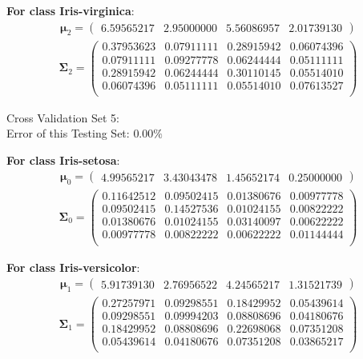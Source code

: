 \documentclass[11pt,a4paper]{article}
\newcommand{\htab}{\hspace*{0.63cm}}
\newcommand{\bs}[1]{\boldsymbol{#1}}
\begin{document}
\textbf{For class Iris-virginica}:
\begin{align} \bs{\mu}_{2} = \begin{pmatrix} 
6.59565217 & 2.95000000 & 5.56086957 & 2.01739130 
 \end{pmatrix}  \end{align} 
\vspace{-1cm}
\begin{align} \bs{\Sigma}_{2} = \begin{pmatrix} 
0.37953623 & 0.07911111 & 0.28915942 & 0.06074396 \\ 
0.07911111 & 0.09277778 & 0.06244444 & 0.05111111 \\ 
0.28915942 & 0.06244444 & 0.30110145 & 0.05514010 \\ 
0.06074396 & 0.05111111 & 0.05514010 & 0.07613527 \\ 
\end{pmatrix} \end{align}

\newpage

Cross Validation Set 5: \\
\htab Error of this Testing Set: $0.00\%$ 

\textbf{For class Iris-setosa}:
\begin{align} \bs{\mu}_{0} = \begin{pmatrix} 
4.99565217 & 3.43043478 & 1.45652174 & 0.25000000 
 \end{pmatrix}  \end{align} 
\vspace{-1cm}
\begin{align} \bs{\Sigma}_{0} = \begin{pmatrix} 
0.11642512 & 0.09502415 & 0.01380676 & 0.00977778 \\ 
0.09502415 & 0.14527536 & 0.01024155 & 0.00822222 \\ 
0.01380676 & 0.01024155 & 0.03140097 & 0.00622222 \\ 
0.00977778 & 0.00822222 & 0.00622222 & 0.01144444 \\ 
\end{pmatrix} \end{align}

\textbf{For class Iris-versicolor}:
\begin{align} \bs{\mu}_{1} = \begin{pmatrix} 
5.91739130 & 2.76956522 & 4.24565217 & 1.31521739 
 \end{pmatrix}  \end{align} 
\vspace{-1cm}
\begin{align} \bs{\Sigma}_{1} = \begin{pmatrix} 
0.27257971 & 0.09298551 & 0.18429952 & 0.05439614 \\ 
0.09298551 & 0.09994203 & 0.08808696 & 0.04180676 \\ 
0.18429952 & 0.08808696 & 0.22698068 & 0.07351208 \\ 
0.05439614 & 0.04180676 & 0.07351208 & 0.03865217 \\ 
\end{pmatrix} \end{align}
\end{document}
